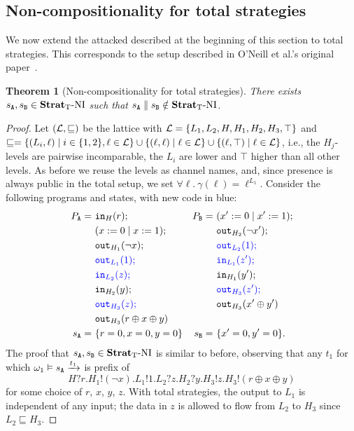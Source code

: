 \documentclass[preprint,5p,twocolumn]{elsarticle}
\newtheorem{theorem}{Theorem}
\begin{document}
\subsection{Non-compositionality for total strategies}

We now extend the attacked described at the beginning of this section to total strategies. This corresponds to the
setup described in O'Neill et al.'s original paper~\cite{ONeill2006}.

\begin{theorem}[Non-compositionality for total strategies]
  \label{thm:noncompositional total}
  There exists $s_{\mathtt{A}},s_{\mathtt{B}} \in \mathbf{Strat}_{\mathrm{T}}\text{-}\mathrm{NI}$ such that $s_{\mathtt{A}} \parallel s_{\mathtt{B}} \notin \mathbf{Strat}_{\mathrm{T}}\text{-}\mathrm{NI}$.
\end{theorem}
\begin{proof}
  Let $(\mathcal{L}, \sqsubseteq)$ be the lattice with $\mathcal{L} = \lbrace L_1, L_2, H, H_1, H_2, H_3, \top \rbrace$
  and $\sqsubseteq = \lbrace (L_i, \ell) \mid i \in \{1,2\},\ell \in \mathcal{L}\rbrace \cup \lbrace (\ell, \ell) \mid \ell \in \mathcal{L}\rbrace
  \cup \lbrace (\ell, \top) \mid \ell \in \mathcal{L}\rbrace$, i.e.,
  the $H_j$-levels are pairwise incomparable, the $L_i$ are lower and $\top$ higher than all other
  levels. As before we reuse the levels as channel names, and, since presence is always public in
  the total setup, we set $\forall \ell.~\gamma(\ell) = \ell^{L_1}$.
  Consider the following programs and states, with new code in blue:
  \begin{align*}
    P_{\mathtt{A}} =~& \mathtt{in}_{H}(r); & P_{\mathtt{B}} =~ & (x' := 0 \mid x' := 1); \\
          &(x := 0 \mid x := 1); && \mathtt{out}_{H_2}(\neg x');\\
          &\mathtt{out}_{H_1}(\neg x); && {\color{blue} \mathtt{out}_{L_2}(1);} \\
          &{\color{blue}\mathtt{out}_{L_1}(1);} && {\color{blue}\mathtt{in}_{L_1}(z');} \\
          &{\color{blue}\mathtt{in}_{L_2}(z);} && \mathtt{in}_{H_1}(y'); \\
          &\mathtt{in}_{H_2}(y); && {\color{blue}\mathtt{out}_{H_3}(z');}\\
          &{\color{blue}\mathtt{out}_{H_3}(z);} && \mathtt{out}_{H_3}(x' \oplus y') \\
          &\mathtt{out}_{H_3}(r \oplus x \oplus y) \\
    s_{\mathtt{A}} =~& \lbrace r = 0, x = 0, y = 0\rbrace & s_{\mathtt{B}} =~& \lbrace x' = 0, y' = 0\rbrace.
  \end{align*}
  The proof that $s_{\mathtt{A}},s_{\mathtt{B}} \in \mathbf{Strat}_{\mathrm{T}}\text{-}\mathrm{NI}$ is similar to before, observing that any $t_1$ for
  which $\omega_1 \vDash s_{\mathtt{A}} \xrightarrow{t_1}$ is prefix of
  $$H?r.H_1!(\neg x).L_1!1.L_2?z.H_2?y.H_3!z.H_3!(r \oplus x \oplus y)$$
  for some choice of $r$, $x$, $y$, $z$. With total strategies, the output to $L_1$ is
  independent of any input; the data in $z$ is allowed to flow from $L_2$ to $H_3$
  since $L_2 \sqsubseteq H_3$.


\end{proof}
\end{document}
